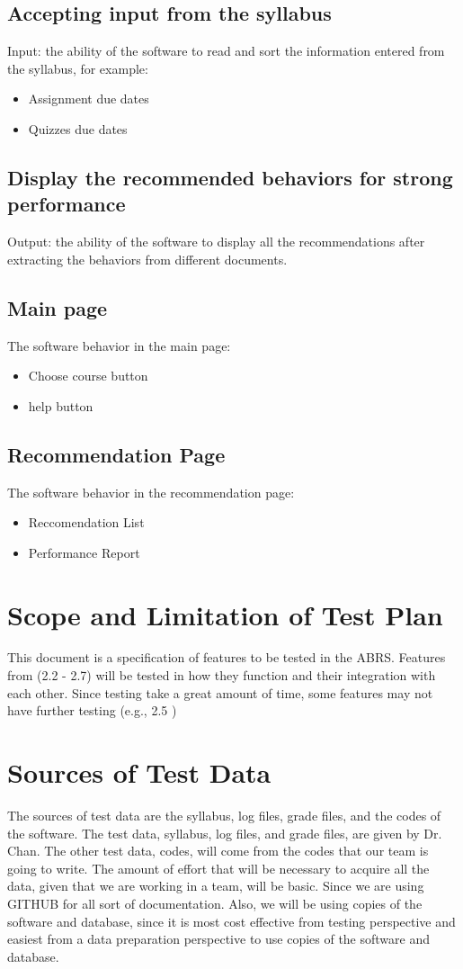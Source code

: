\documentclass[12pt]{article}
\begin{document}
\subsection{Accepting input from the syllabus}
Input: the ability of the software to read and sort the information entered from the syllabus, for example:  
\begin{itemize}
	\item Assignment due dates
	\item Quizzes due dates
\end{itemize}

\subsection{Display the recommended behaviors for strong performance }
Output:  the ability of the software to display all the recommendations after extracting the behaviors from different documents. 

\subsection{Main page}
The software behavior in the main page:
\begin{itemize}
	\item Choose course button
	\item help button
\end{itemize}

\subsection{Recommendation Page}
The software behavior in the recommendation page:
\begin{itemize}
	\item Reccomendation List
	\item Performance Report
\end{itemize}

\section{Scope and Limitation of Test Plan}
This document is a specification of features to be tested in the ABRS. Features from (2.2 - 2.7) will be tested in how they function and their integration with each other. Since testing take a great amount of time, some features may not have further testing (e.g., 2.5 )

\section{Sources of Test Data}
The sources of test data are the syllabus, log files, grade files, and the codes of the software. The test data, syllabus, log files, and grade files, are given by Dr. Chan. The other test data, codes, will come from  the codes that our team is going to write. The amount  of effort that will be necessary to acquire all the data, given that we are working in a team, will be  basic. Since we are using GITHUB for all sort of documentation. Also, we will be using copies of the software and database, since it is most cost effective from testing perspective and easiest from a data preparation perspective to use copies of the software and database. 
\end{document}
